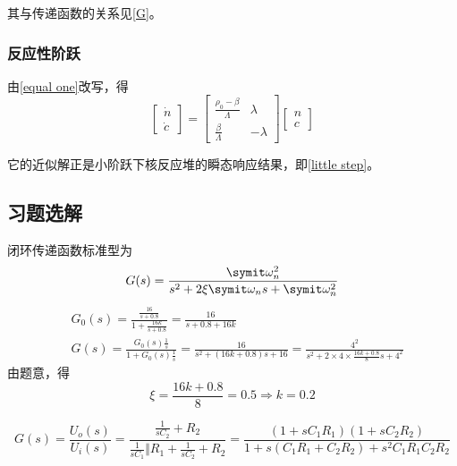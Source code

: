 其与传递函数的关系见\cref{G}。

\subsubsection{反应性阶跃}

由\cref{equal one}改写，得
\begin{equation}
    \begin{bmatrix}
        \dot{n} \\
        \dot{c}
    \end{bmatrix} = \begin{bmatrix}
        \frac{\rho_0 - \beta}{\varLambda} & \lambda \\
        \frac{\beta}{\varLambda} & -\lambda
    \end{bmatrix} \begin{bmatrix}
        n \\
        c
    \end{bmatrix}
\end{equation}

它的近似解正是小阶跃下核反应堆的瞬态响应结果，即\cref{little step}。
\subsection{习题选解}

\begin{exercise} %
    闭环传递函数标准型为
    \begin{equation*}
        G(s) = \frac{\varomega_n^2}{s^2 + 2\xi \varomega_n s + \varomega_n^2}
    \end{equation*}
    \begin{align*}
        &G_0(s) = \frac{\frac{16}{s+0.8}}{1+\frac{16k}{s+0.8}} = \frac{16}{s+0.8+16k} \\
        &G(s) = \frac{G_0(s)\frac{1}{s}}{1+G_0(s)\frac{1}{s}} = \frac{16}{s^2 + (16k+0.8)s + 16} = \frac{4^2}{s^2 + 2\times 4 \times \frac{16k+0.8}{8}s + 4^2}
    \end{align*}
    由题意，得
    \begin{equation*}
        \xi = \frac{16k+0.8}{8} = 0.5 \Rightarrow k = 0.2
    \end{equation*}
\end{exercise}

\setcounter{exercise}{2}

\begin{exercise} %
    \begin{equation*}
        G(s) = \frac{U_o(s)}{U_i(s)} = \frac{\frac{1}{sC_2}+R_2}{\frac{1}{sC_1}\Vert R_1 + \frac{1}{sC_2} + R_2} = \frac{(1+sC_1 R_1)(1+sC_2 R_2)}{1+s(C_1 R_1 + C_2 R_2)+s^2 C_1R_1 C_2R_2}
    \end{equation*}
\end{exercise}


